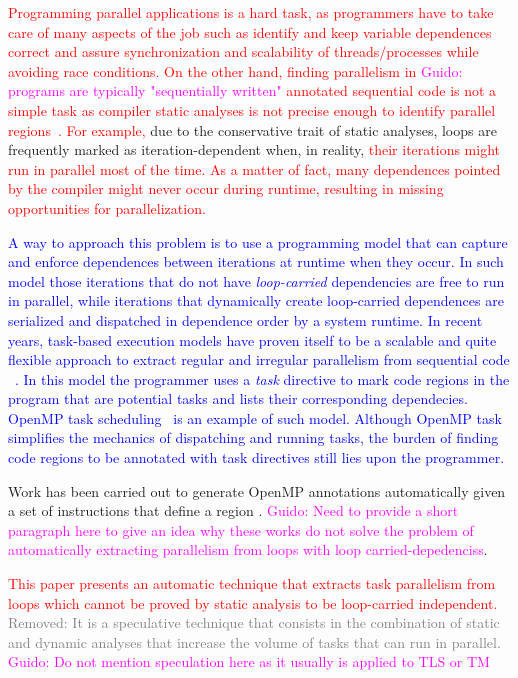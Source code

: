 \documentclass[pageno]{jpaper}
\newcommand{\guido}[1]{\noindent\textcolor{magenta}{Guido: {#1}}}
\newcommand{\rmv}[1]{\noindent\textcolor{gray}{Removed: {#1}}}
\newcommand{\new}[1]{\noindent\textcolor{blue}{ {#1}}}
\newcommand{\ed}[1]{\noindent\textcolor{red}{ {#1}}}
\newcommand{\guido}[1]{}
\newcommand{\rmv}[1]{}
\newcommand{\new}[1]{#1}
\newcommand{\ed}[1]{}
\begin{document}
\ed{Programming parallel applications is a hard task, as programmers have to take care of many aspects of the job such as identify and keep variable dependences correct and assure synchronization and scalability of threads/processes while avoiding race conditions.} \ed{On the other hand, finding parallelism in \rem{sequentially-written} \guido{programs are typically "sequentially written"}  \ed{annotated sequential  code is not a simple task} as compiler static analyses is not precise enough to identify  parallel regions~\cite{kulkarni2007optimistic}. For example,} due  to the conservative trait of static analyses, loops are frequently marked as iteration-dependent when, in reality, \ed{their iterations might run in parallel most of the time. As a matter of fact,  many dependences pointed by the compiler might never occur during runtime, resulting in missing opportunities for parallelization.} 

\new{A way to approach this problem is to use a programming model that can capture and enforce dependences between iterations at runtime when they occur. In such model  those iterations that do not have {\it loop-carried} dependencies are free to run in parallel, while iterations that dynamically create loop-carried dependences are serialized and dispatched in dependence order by  a system runtime.  In recent years, task-based execution models  have proven itself to be a scalable and quite flexible approach to extract regular and irregular parallelism from sequential code ~\cite{starss,bddt,cilk,sequoia,dandelion,legion,ooojava,dague}. In this model the programmer uses a {\it task} directive to mark  code regions in the program that are potential tasks and lists their corresponding dependecies.  OpenMP task scheduling~\cite{openmp2009}  is an example of such model. Although OpenMP task simplifies the mechanics of dispatching and running tasks, the burden of finding code regions to be  annotated with task directives still lies upon the programmer.}

Work has been carried out to generate OpenMP annotations automatically given a set of instructions that define  a region \cite{gleison2016, pingali2011tao, wanggenerating}. \guido{Need to provide a short paragraph here to give an idea why these works do not solve the problem of automatically extracting parallelism from loops with loop carried-depedenciss}.

\ed{This paper presents an automatic technique that extracts task parallelism from loops which cannot be proved by static analysis to be loop-carried independent. } 
\rmv{It is a speculative technique that consists in the combination of static and dynamic analyses that increase 
the volume of tasks that can run in parallel.} \guido{Do not mention speculation here as it usually is applied to TLS or TM} 
\end{document}

